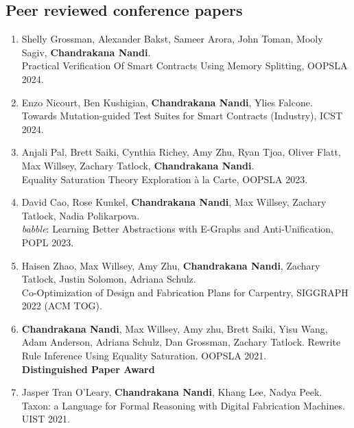 \documentclass[margin, 10pt]{res} %
\begin{document}
\begin{resume}
\begin{enumerate}
\end{enumerate}

\subsection{Peer reviewed conference papers}
\begin{enumerate}

  \item Shelly Grossman, Alexander Bakst, Sameer Arora, John Toman, Mooly Sagiv, \textbf{Chandrakana Nandi}. \\
    Practical Verification Of Smart Contracts Using Memory Splitting, OOPSLA 2024. \\


  \item Enzo Nicourt, Ben Kushigian, \textbf{Chandrakana Nandi}, Ylies Falcone. \\
    Towards Mutation-guided Test Suites for Smart Contracts (Industry), ICST 2024.

  \item Anjali Pal, Brett Saiki, Cynthia Richey, Amy Zhu, Ryan Tjoa, Oliver Flatt, Max Willsey, Zachary Tatlock, \textbf{Chandrakana Nandi}. \\
    Equality Saturation Theory Exploration à la Carte, OOPSLA 2023.

  \item David Cao, Rose Kunkel, \textbf{Chandrakana Nandi}, Max Willsey, Zachary Tatlock, Nadia Polikarpova. \\
    \textit{babble}: Learning Better Abstractions with E-Graphs and Anti-Unification, POPL 2023.

  \item Haisen  Zhao, Max Willsey, Amy Zhu, \textbf{Chandrakana Nandi}, Zachary Tatlock, Justin Solomon, Adriana Schulz. \\
    Co-Optimization of Design and Fabrication Plans for Carpentry, SIGGRAPH 2022 (ACM TOG).

  \item \textbf{Chandrakana Nandi}, Max Willsey, Amy zhu, Brett Saiki, Yisu Wang, Adam Anderson, Adriana Schulz, Dan Grossman, Zachary Tatlock.
    Rewrite Rule Inference Using Equality Saturation. OOPSLA 2021. \\
    \textbf{Distinguished Paper Award}

  \item Jasper Tran O'Leary, \textbf{Chandrakana Nandi}, Khang Lee, Nadya Peek. \\
  Taxon: a Language for Formal Reasoning with Digital Fabrication Machines. UIST 2021.


\end{enumerate}
\end{resume}
\end{document}
